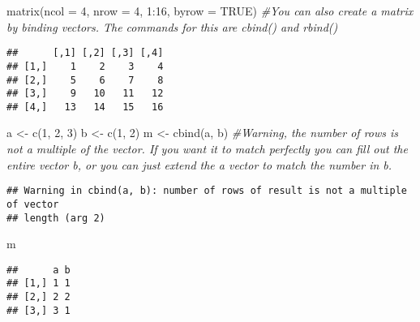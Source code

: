 \documentclass[
]{article}
\newenvironment{Shaded}{\begin{snugshade}}{\end{snugshade}}
\newcommand{\AttributeTok}[1]{\textcolor[rgb]{0.77,0.63,0.00}{#1}}
\newcommand{\CommentTok}[1]{\textcolor[rgb]{0.56,0.35,0.01}{\textit{#1}}}
\newcommand{\ConstantTok}[1]{\textcolor[rgb]{0.00,0.00,0.00}{#1}}
\newcommand{\DecValTok}[1]{\textcolor[rgb]{0.00,0.00,0.81}{#1}}
\newcommand{\FunctionTok}[1]{\textcolor[rgb]{0.00,0.00,0.00}{#1}}
\newcommand{\NormalTok}[1]{#1}
\newcommand{\OtherTok}[1]{\textcolor[rgb]{0.56,0.35,0.01}{#1}}
\newcommand{\SpecialCharTok}[1]{\textcolor[rgb]{0.00,0.00,0.00}{#1}}
\begin{document}
\begin{Shaded}
\begin{Highlighting}[]
\FunctionTok{matrix}\NormalTok{(}\AttributeTok{ncol =} \DecValTok{4}\NormalTok{,}
       \AttributeTok{nrow =} \DecValTok{4}\NormalTok{,}
       \DecValTok{1}\SpecialCharTok{:}\DecValTok{16}\NormalTok{,}
       \AttributeTok{byrow =} \ConstantTok{TRUE}\NormalTok{) }\CommentTok{\#You can also create a matrix by binding vectors. The commands for this are cbind() and rbind()}
\end{Highlighting}
\end{Shaded}

\begin{verbatim}
##      [,1] [,2] [,3] [,4]
## [1,]    1    2    3    4
## [2,]    5    6    7    8
## [3,]    9   10   11   12
## [4,]   13   14   15   16
\end{verbatim}

\begin{Shaded}
\begin{Highlighting}[]
\NormalTok{a }\OtherTok{\textless{}{-}} \FunctionTok{c}\NormalTok{(}\DecValTok{1}\NormalTok{, }\DecValTok{2}\NormalTok{, }\DecValTok{3}\NormalTok{)}
\NormalTok{b }\OtherTok{\textless{}{-}} \FunctionTok{c}\NormalTok{(}\DecValTok{1}\NormalTok{, }\DecValTok{2}\NormalTok{)}
\NormalTok{m }\OtherTok{\textless{}{-}}
  \FunctionTok{cbind}\NormalTok{(a, b) }\CommentTok{\#Warning, the number of rows is not a multiple of the vector. If you want it to match perfectly you can fill out the entire vector b, or you can just extend the a vector to match the number in b.}
\end{Highlighting}
\end{Shaded}

\begin{verbatim}
## Warning in cbind(a, b): number of rows of result is not a multiple of vector
## length (arg 2)
\end{verbatim}

\begin{Shaded}
\begin{Highlighting}[]
\NormalTok{m}
\end{Highlighting}
\end{Shaded}

\begin{verbatim}
##      a b
## [1,] 1 1
## [2,] 2 2
## [3,] 3 1
\end{verbatim}
\end{document}
